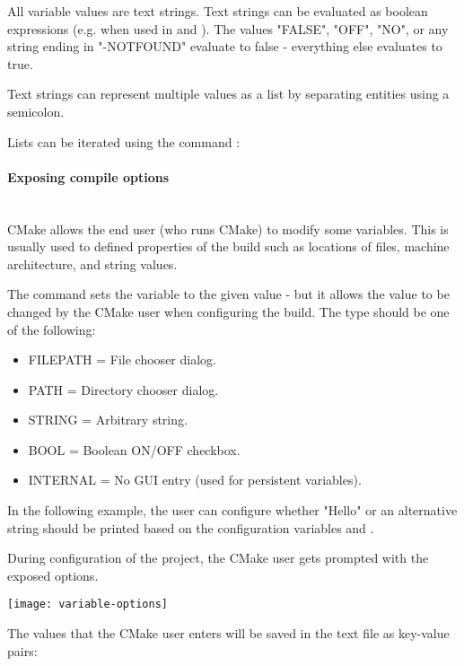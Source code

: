 \documentclass[11pt,a4paper,landscape]{scrartcl} %
\newcommand{\sectiontitle}[1]{\paragraph{#1} \ \\} %
\begin{document}
\begin{multicols}{2}
All variable values are text strings. Text strings can be evaluated as boolean expressions (e.g. when used in  and ). The values "FALSE", "OFF", "NO", or any string ending in "-NOTFOUND" evaluate to false - everything else evaluates to true.

Text strings can represent multiple values as a list by separating entities using a semicolon.



Lists can be iterated using the command :


			
\sectiontitle{Exposing compile options}
			
CMake allows the end user (who runs CMake) to modify some variables.  This is usually used to defined properties of the build such as locations of files, machine architecture, and string values.

The command  sets the variable to the given value - but it allows the value to be changed by the CMake user when configuring the build. The type should be one of the following:

\begin{itemize}  
\item FILEPATH = File chooser dialog.
\item PATH     = Directory chooser dialog.
\item STRING   = Arbitrary string.
\item BOOL     = Boolean ON/OFF checkbox.
\item INTERNAL = No GUI entry (used for persistent variables).
\end{itemize}

In the following example, the user can configure whether "Hello" or an alternative string should be printed based on the configuration variables  and .
 


During configuration of the project, the CMake user gets prompted with the exposed options.

\texttt{[image: variable-options]}

The values that the CMake user enters will be saved in the text file  as key-value pairs:


\end{multicols}
\end{document}

